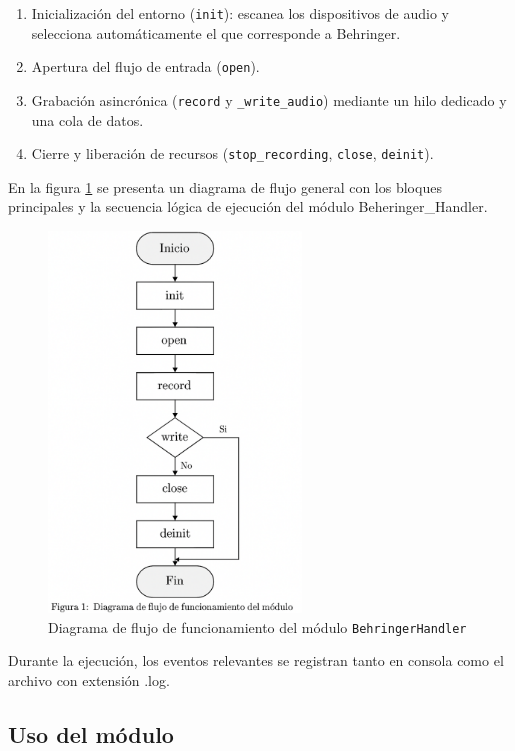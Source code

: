 \begin{enumerate}
    \item Inicialización del entorno (\texttt{init}): escanea los dispositivos de audio y selecciona automáticamente el que corresponde a Behringer.
    \item Apertura del flujo de entrada (\texttt{open}).
    \item Grabación asincrónica (\texttt{record} y \texttt{\_write\_audio}) mediante un hilo dedicado y una cola de datos.
    \item Cierre y liberación de recursos (\texttt{stop\_recording}, \texttt{close}, \texttt{deinit}).
\end{enumerate}

En la figura \ref{fig:workflow} se presenta un diagrama de flujo general con los bloques principales y la secuencia lógica de ejecución del módulo Beheringer\_Handler.

\begin{figure}[htpb]
    \centering
    \includegraphics[width=0.6\textwidth]{graficos/workflow.png}
    \caption{Diagrama de flujo de funcionamiento del módulo \texttt{BehringerHandler}}
    \label{fig:workflow}
\end{figure}

Durante la ejecución, los eventos relevantes se registran tanto en consola como el archivo con extensión .log.

\subsection{Uso del módulo}

